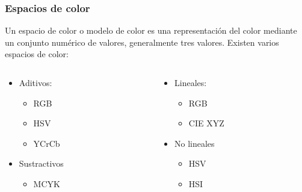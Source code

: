 \begin{frame}\frametitle{Espacios de color}
  Un espacio de color o modelo de color es una representación del color mediante un conjunto numérico de valores, generalmente tres valores. Existen varios espacios de color:
  \begin{columns}
    \begin{column}{0.5\textwidth}
      \begin{itemize}
      \item Aditivos:
        \begin{itemize}
        \item RGB
        \item HSV
        \item YCrCb
        \end{itemize}
      \item Sustractivos
        \begin{itemize}
        \item MCYK
        \end{itemize}
      \end{itemize}
    \end{column}
    \begin{column}{0.5\textwidth}
      \begin{itemize}
      \item Lineales:
        \begin{itemize}
        \item RGB
        \item CIE XYZ
        \end{itemize}
      \item No lineales
        \begin{itemize}
        \item HSV
        \item HSI 
        \end{itemize}
      \end{itemize}
    \end{column}
  \end{columns}
\end{frame}

